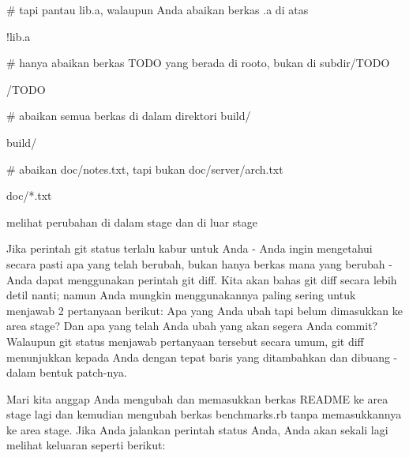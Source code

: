 \noindent 
{\fontsize{14pt}{14pt}\selectfont  $  \#  $ tapi pantau lib.a, walaupun Anda abaikan berkas .a di atas \\} \par
\noindent 
{\fontsize{14pt}{14pt}\selectfont !lib.a \\} \par
\noindent 
{\fontsize{14pt}{14pt}\selectfont  $  \#  $ hanya abaikan berkas TODO yang berada di rooto, bukan di subdir/TODO \\} \par
\noindent 
{\fontsize{14pt}{14pt}\selectfont /TODO \\} \par
\noindent 
{\fontsize{14pt}{14pt}\selectfont  $  \#  $ abaikan semua berkas di dalam direktori build/ \\} \par
\noindent 
{\fontsize{14pt}{14pt}\selectfont build/ \\} \par
\noindent 
{\fontsize{14pt}{14pt}\selectfont  $  \#  $ abaikan doc/notes.txt, tapi bukan doc/server/arch.txt \\} \par
\noindent 
{\fontsize{14pt}{14pt}\selectfont doc/*.txt \\} \par
\vspace{14pt}
\noindent 
{\fontsize{14pt}{14pt}\selectfont melihat perubahan di dalam stage dan di luar stage \\} \par
\vspace{14pt}
\noindent 
{\fontsize{14pt}{14pt}\selectfont Jika perintah $  $git status $  $terlalu kabur untuk Anda - Anda ingin mengetahui secara pasti apa yang telah berubah, bukan hanya berkas mana yang berubah - Anda dapat menggunakan perintah $  $git diff. Kita akan bahas $  $git diff $  $secara lebih detil nanti; namun Anda mungkin menggunakannya paling sering untuk menjawab 2 pertanyaan berikut: Apa yang Anda ubah tapi belum dimasukkan ke area stage? Dan apa yang telah Anda ubah yang akan segera Anda commit? Walaupun $  $git status $  $menjawab pertanyaan tersebut secara umum, $  $git diff $  $menunjukkan kepada Anda dengan tepat baris yang ditambahkan dan dibuang - dalam bentuk patch-nya. \\} \par
\noindent 
{\fontsize{14pt}{14pt}\selectfont Mari kita anggap Anda mengubah dan memasukkan berkas README ke area stage lagi dan kemudian mengubah berkas benchmarks.rb tanpa memasukkannya ke area stage. Jika Anda jalankan perintah $  $status $  $Anda, Anda akan sekali lagi melihat keluaran seperti berikut: \\} \par
